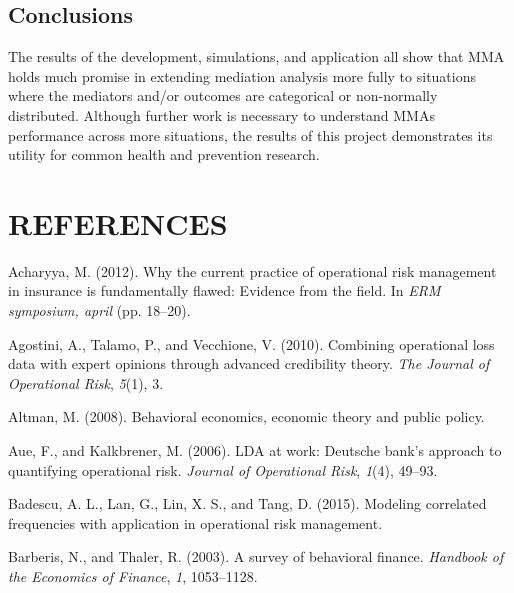 \documentclass[]{DissertateUSU}
\begin{document}
\section{Conclusions}\label{conclusions-2}

The results of the development, simulations, and application all show
that MMA holds much promise in extending mediation analysis more fully
to situations where the mediators and/or outcomes are categorical or
non-normally distributed. Although further work is necessary to
understand MMAs performance across more situations, the results of this
project demonstrates its utility for common health and prevention
research.

\singlespacing

\FloatBarrier

\newpage

 \fancyhead[R]{\thepage} \fancyfoot[C]{}

\chapter*{REFERENCES}

\setlength{\parindent}{-0.5in} \setlength{\leftskip}{0.4in}
\setlength{\parskip}{6pt} \noindent

\hypertarget{refs}{}
\hypertarget{ref-acharyya2012current}{}
Acharyya, M. (2012). Why the current practice of operational risk
management in insurance is fundamentally flawed: Evidence from the
field. In \emph{ERM symposium, april} (pp. 18--20).

\hypertarget{ref-agostini2010combining}{}
Agostini, A., Talamo, P., and Vecchione, V. (2010). Combining
operational loss data with expert opinions through advanced credibility
theory. \emph{The Journal of Operational Risk}, \emph{5}(1), 3.

\hypertarget{ref-altman2008behavioral}{}
Altman, M. (2008). Behavioral economics, economic theory and public
policy.

\hypertarget{ref-aue2006lda}{}
Aue, F., and Kalkbrener, M. (2006). LDA at work: Deutsche bank's
approach to quantifying operational risk. \emph{Journal of Operational
Risk}, \emph{1}(4), 49--93.

\hypertarget{ref-badescu2015modeling}{}
Badescu, A. L., Lan, G., Lin, X. S., and Tang, D. (2015). Modeling
correlated frequencies with application in operational risk management.

\hypertarget{ref-barberis2003survey}{}
Barberis, N., and Thaler, R. (2003). A survey of behavioral finance.
\emph{Handbook of the Economics of Finance}, \emph{1}, 1053--1128.
\end{document}
